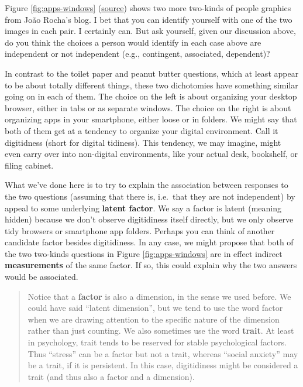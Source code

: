 \documentclass[openany]{book}
\begin{document}
Figure \ref{fig:apps-windows} (\href{https://2kindsofpeople.tumblr.com/}{source}) shows two more two-kinds of people graphics from João Rocha's blog. I bet that you can identify yourself with one of the two images in each pair. I certainly can. But ask yourself, given our discussion above, do you think the choices a person would identify in each case above are independent or not independent (e.g., contingent, associated, dependent)?

In contrast to the toilet paper and peanut butter questions, which at least appear to be about totally different things, these two dichotomies have something similar going on in each of them. The choice on the left is about organizing your desktop browser, either in tabs or as separate windows. The choice on the right is about organizing apps in your smartphone, either loose or in folders. We might say that both of them get at a tendency to organize your digital environment. Call it digitidness (short for digital tidiness). This tendency, we may imagine, might even carry over into non-digital environments, like your actual desk, bookshelf, or filing cabinet.

What we've done here is to try to explain the association between responses to the two questions (assuming that there is, i.e.~that they are not independent) by appeal to some underlying \textbf{latent factor}. We say a factor is latent (meaning hidden) because we don't observe digitidiness itself directly, but we only observe tidy browsers or smartphone app folders. Perhaps you can think of another candidate factor besides digitidiness. In any case, we might propose that both of the two two-kinds questions in Figure \ref{fig:apps-windows} are in effect indirect \textbf{measurements} of the same factor. If so, this could explain why the two answers would be associated.

\begin{quote}
Notice that a \textbf{factor} is also a dimension, in the sense we used before. We could have said ``latent dimension'', but we tend to use the word factor when we are drawing attention to the specific nature of the dimension rather than just counting. We also sometimes use the word \textbf{trait}. At least in psychology, trait tends to be reserved for stable psychological factors. Thus ``stress'' can be a factor but not a trait, whereas ``social anxiety'' may be a trait, if it is persistent. In this case, digitidiness might be considered a trait (and thus also a factor and a dimension).
\end{quote}
\end{document}
